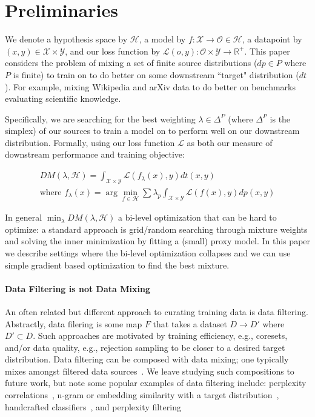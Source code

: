 \section{Preliminaries}


We denote a hypothesis space by $\mathcal{H}$, a model by $f: \mathcal{X} \rightarrow \mathcal{O} \in \mathcal{H}$, a datapoint by $(x,y) \in \mathcal{X} \times \mathcal{Y}$, and our loss function by $\mathcal{L}(o,y): \mathcal{O} \times \mathcal{Y} \rightarrow \mathbb{R}^{+}$. This paper considers the problem of mixing a set of finite source distributions ($dp \in P$ where $P$ is finite) to train on to do better on some downstream ``target" distribution ($dt$). For example, mixing Wikipedia and arXiv data to do better on benchmarks evaluating scientific knowledge.


Specifically, we are searching for the best weighting $\lambda \in \Delta^P$ (where $\Delta^{P}$ is the simplex) of our sources to train a model on to perform well on our downstream distribution. Formally, using our loss function $\mathcal{L}$ as both our measure of downstream performance and training objective:




\begin{align*}
\label{eq:DM}
DM(\lambda,\mathcal{H}) = \int_{\mathcal{X} \times \mathcal{Y}} \mathcal{L}(f_{\lambda}(x),y) dt(x,y) \\
    \text{where } f_\lambda(x) = \arg \min_{f \in \mathcal{H}} \sum \lambda_p \int_{\mathcal{X} \times \mathcal{Y}} \mathcal{L}(f(x),y) dp(x,y) \tag{Data Mixing}
\end{align*}




In general $\min_\lambda DM(\lambda,\mathcal{H})$ a bi-level optimization that can be hard to optimize: a standard approach is grid/random searching through mixture weights and solving the inner minimization by fitting a (small) proxy model. In this paper we describe settings where the bi-level optimization collapses and we can use simple gradient based optimization to find the best mixture. 

\paragraph{Data Filtering is not Data Mixing} An often related but different approach to curating training data is data filtering. Abstractly, data filering is some map $F$ that takes a dataset $D \rightarrow D'$ where $D' \subset D$. Such approaches are motivated by training efficiency, e.g., coresets, and/or data quality, e.g., rejection sampling to be closer to a desired target distribution. Data filtering can be composed with data mixing; one typically mixes amongst filtered data sources~\citep{dubey2024llama}. We leave studying such compositions to future work, but note some popular examples of data filtering include: perplexity correlations~\citep{thrush2024improving}, n-gram or embedding similarity with a target distribution~\citep{dsir, gio}, handcrafted classifiers~\citep{cpack, dclm}, and perplexity filtering~\citep{dclm} 





